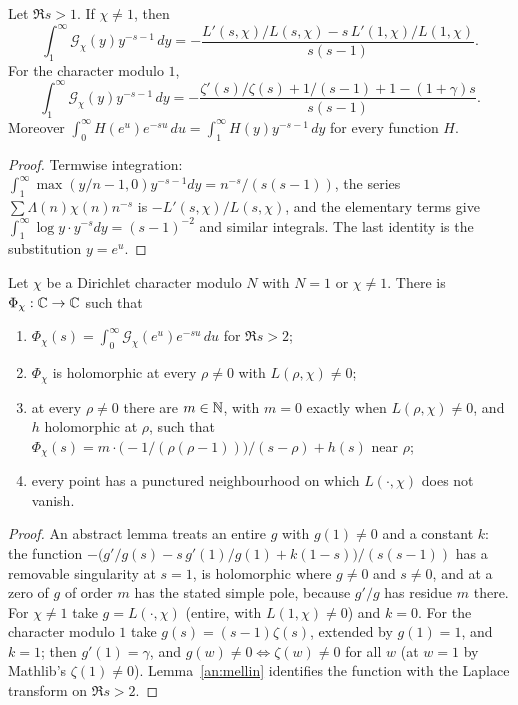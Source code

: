 \begin{lemma}\label{an:mellin}
Let $\Re s>1$. If $\chi\ne1$, then
\[
\int_1^{\infty}\mathcal G_{\chi}(y)y^{-s-1}\,dy
=-\frac{L'(s,\chi)/L(s,\chi)-s\,L'(1,\chi)/L(1,\chi)}{s(s-1)}.
\]
For the character modulo $1$,
\[
\int_1^{\infty}\mathcal G_{\chi}(y)y^{-s-1}\,dy
=-\frac{\zeta'(s)/\zeta(s)+1/(s-1)+1-(1+\gamma)s}{s(s-1)}.
\]
Moreover $\int_0^{\infty} H(e^u)e^{-su}\,du=\int_1^{\infty} H(y)y^{-s-1}\,dy$
for every function $H$.
\end{lemma}
\begin{proof}
Termwise integration: $\int_1^{\infty}\max(y/n-1,0)y^{-s-1}dy
=n^{-s}/(s(s-1))$, the series $\sum\Lambda(n)\chi(n)n^{-s}$ is
$-L'(s,\chi)/L(s,\chi)$, and the elementary terms give
$\int_1^{\infty}\log y\cdot y^{-s}dy=(s-1)^{-2}$ and similar integrals. The last
identity is the substitution $y=e^u$.
\end{proof}

\begin{lemma}\label{an:polechar}
Let $\chi$ be a Dirichlet character modulo $N$ with $N=1$ or $\chi\ne1$.
There is $\Phi_{\chi}:\mathbb{C}\to\mathbb{C}$ such that
\begin{enumerate}
\item $\Phi_{\chi}(s)=\int_0^{\infty}\mathcal G_{\chi}(e^u)e^{-su}\,du$ for $\Re s>2$;
\item $\Phi_{\chi}$ is holomorphic at every $\rho\ne0$ with
$L(\rho,\chi)\ne0$;
\item at every $\rho\ne0$ there are $m\in\mathbb{N}$, with $m=0$ exactly when
$L(\rho,\chi)\ne0$, and $h$ holomorphic at $\rho$, such that
$\Phi_{\chi}(s)=m\cdot\bigl(-1/(\rho(\rho-1))\bigr)/(s-\rho)+h(s)$ near $\rho$;
\item every point has a punctured neighbourhood on which $L(\cdot,\chi)$
does not vanish.
\end{enumerate}
\end{lemma}
\begin{proof}
An abstract lemma treats an entire $g$ with $g(1)\ne0$ and a constant
$k$: the function
$-\bigl(g'/g(s)-s\,g'(1)/g(1)+k(1-s)\bigr)/(s(s-1))$ has a removable
singularity at $s=1$, is holomorphic where $g\ne0$ and $s\ne0$, and at a
zero of $g$ of order $m$ has the stated simple pole, because $g'/g$ has
residue $m$ there. For $\chi\ne1$ take $g=L(\cdot,\chi)$ (entire, with
$L(1,\chi)\ne0$) and $k=0$. For the character modulo $1$ take
$g(s)=(s-1)\zeta(s)$, extended by $g(1)=1$, and $k=1$; then $g'(1)=\gamma$,
and $g(w)\ne0\iff\zeta(w)\ne0$ for all $w$ (at $w=1$ by Mathlib's
$\zeta(1)\ne0$). Lemma~\ref{an:mellin} identifies the function with the
Laplace transform on $\Re s>2$.
\end{proof}

